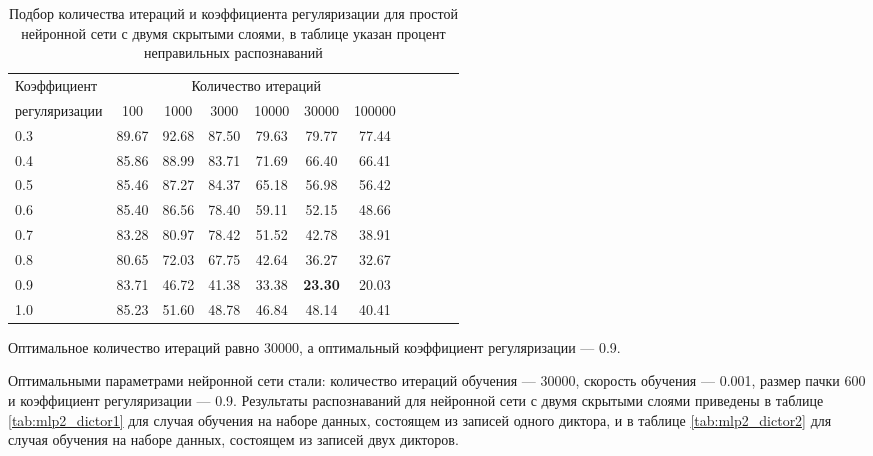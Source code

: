 \begin{table}[h]
	\centering
	\caption{Подбор количества итераций и коэффициента регуляризации для простой нейронной сети с двумя скрытыми слоями, в таблице указан процент неправильных распознаваний}
	\label{tab:mlp2_bf_iter_reg}
	\begin{tabular}{| l | c | c | c | c | c | c | c | c | c | c |}
		\hline
		Коэффициент	  & \multicolumn{6}{c|}{Количество итераций} \\
		\hhline{~----------}
		регуляризации & \phantom{0} 100 \phantom{0} & \phantom{0} 1000 \phantom{0} & \phantom{0} 3000 \phantom{0} & \phantom{0} 10000 \phantom{0} & \phantom{0} 30000 \phantom{0} & \phantom{0} 100000 \phantom{0} \\
		\hline
		0.3			  & 89.67 & 92.68 & 87.50 & 79.63 & 79.77 & 77.44 \\
		0.4			  & 85.86 & 88.99 & 83.71 & 71.69 & 66.40 & 66.41 \\
		0.5			  & 85.46 & 87.27 & 84.37 & 65.18 & 56.98 & 56.42 \\
		0.6			  & 85.40 & 86.56 & 78.40 & 59.11 & 52.15 & 48.66 \\
		0.7			  & 83.28 & 80.97 & 78.42 & 51.52 & 42.78 & 38.91 \\
		0.8			  & 80.65 & 72.03 & 67.75 & 42.64 & 36.27 & 32.67 \\
		0.9			  & 83.71 & 46.72 & 41.38 & 33.38 & \textbf{23.30} & 20.03 \\
		1.0			  & 85.23 & 51.60 & 48.78 & 46.84 & 48.14 & 40.41 \\
		\hline
	\end{tabular}
\end{table}

Оптимальное количество итераций равно 30000, а оптимальный коэффициент регуляризации --- 0.9.

Оптимальными параметрами нейронной сети стали: количество итераций обучения --- 30000, скорость обучения --- 0.001, размер пачки 600 и коэффициент регуляризации --- 0.9.
Результаты распознаваний для нейронной сети с двумя скрытыми слоями приведены в таблице \ref{tab:mlp2_dictor1} для случая обучения на наборе данных, состоящем из записей одного диктора, и в таблице \ref{tab:mlp2_dictor2} для случая обучения на наборе данных, состоящем из записей двух дикторов.

